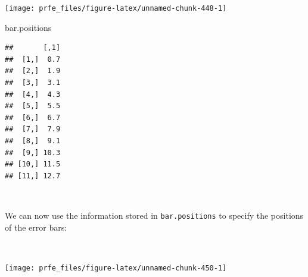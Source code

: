 \documentclass[12pt,a4paper]{book}
\newenvironment{Shaded}{\begin{snugshade}}{\end{snugshade}}
\newcommand{\DataTypeTok}[1]{\textcolor[rgb]{0.13,0.29,0.53}{#1}}
\newcommand{\DecValTok}[1]{\textcolor[rgb]{0.00,0.00,0.81}{#1}}
\newcommand{\FloatTok}[1]{\textcolor[rgb]{0.00,0.00,0.81}{#1}}
\newcommand{\KeywordTok}[1]{\textcolor[rgb]{0.13,0.29,0.53}{\textbf{#1}}}
\newcommand{\NormalTok}[1]{#1}
\newcommand{\OperatorTok}[1]{\textcolor[rgb]{0.81,0.36,0.00}{\textbf{#1}}}
\newcommand{\StringTok}[1]{\textcolor[rgb]{0.31,0.60,0.02}{#1}}
\theoremstyle{definition}
\theoremstyle{definition}
\theoremstyle{definition}
\theoremstyle{remark}
\begin{document}
\begin{Shaded}
\end{Shaded}

\begin{center}\texttt{[image: prfe\_files/figure-latex/unnamed-chunk-448-1]} \end{center}

\begin{Shaded}
\begin{Highlighting}[]
\NormalTok{bar.positions}
\end{Highlighting}
\end{Shaded}

\begin{verbatim}
##       [,1]
##  [1,]  0.7
##  [2,]  1.9
##  [3,]  3.1
##  [4,]  4.3
##  [5,]  5.5
##  [6,]  6.7
##  [7,]  7.9
##  [8,]  9.1
##  [9,] 10.3
## [10,] 11.5
## [11,] 12.7
\end{verbatim}

~

We can now use the information stored in \texttt{bar.positions} to
specify the positions of the error bars:

~

\begin{Shaded}
\end{Shaded}

\newpage

\begin{center}\texttt{[image: prfe\_files/figure-latex/unnamed-chunk-450-1]} \end{center}
\end{document}
